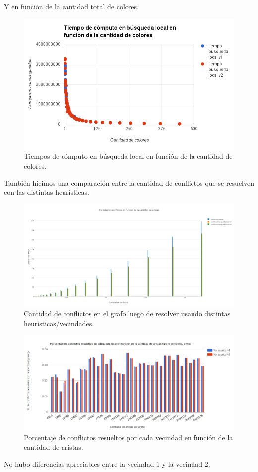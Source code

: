  Y en función de la cantidad total de colores.
 
  \begin{figure}[]
	\centering
 	\includegraphics[width=18cm]{imagenes/Ej4/TvsColores.png}
	\caption{Tiempos de cómputo en búsqueda local en función de la cantidad de colores.}
	\label{coloresEj4-2}
 \end{figure}
 
 También hicimos una comparación entre la cantidad de conflictos que se resuelven con las distintas heurísticas.
 
  \begin{figure}[]
	\centering
 	\includegraphics[width=18cm]{imagenes/Ej4/conflictosVsAristas.png}
	\caption{Cantidad de conflictos en el grafo luego de resolver usando distintas heurísticas/vecindades.}
	\label{conflictosEj4}
 \end{figure}
 
\begin{figure}[]
	\centering
 	\includegraphics[width=18cm]{imagenes/Ej4/porcentajeConflictosVsAristas.png}
	\caption{Porcentaje de conflictos resueltos por cada vecindad en función de la cantidad de aristas.}
	\label{conflictosEj4-porcentaje}
 \end{figure}

 
 No hubo diferencias apreciables entre la vecindad 1 y la vecindad 2.